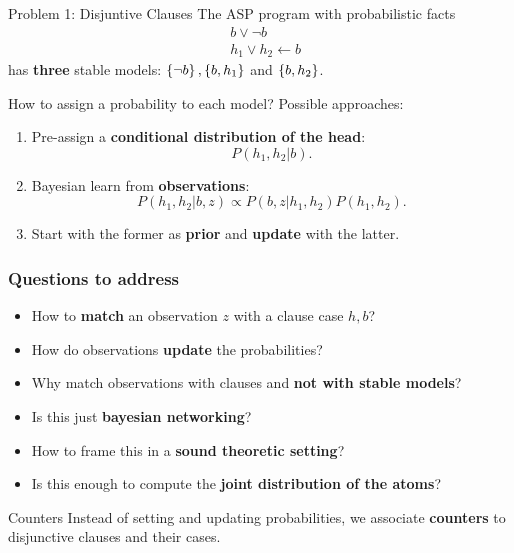 \documentclass[bigger]{beamer}
\begin{document}
    \begin{frame}{Problem 1: Disjuntive Clauses}
        The ASP program with probabilistic facts
        $$        
        \begin{aligned}
            &b \vee \neg b\\
            &h_1 \vee h_2 \leftarrow b
        \end{aligned}
        $$
        has \textbf{three} stable models: $\set{\neg b}, \set{b, h_1}$ and $\set{b, h_2}$.  

        \begin{block}{How to assign a probability to each model?}
            \pause 
            Possible approaches:
            \begin{enumerate}
                \item Pre-assign a \textbf{conditional distribution of the head}:
                $$P(h_1, h_2 | b).$$
                \item Bayesian learn from \textbf{observations}:
                $$P(h_1, h_2 | b,z) \propto P(b, z | h_1, h_2) P(h_1, h_2).$$
                \item Start with the former as \textbf{prior} and \textbf{update} with the latter.
            \end{enumerate}     
        \end{block}       
    
    \end{frame}

    \begin{frame}
        \frametitle{Questions to address}
    
        \begin{itemize}
            \item How to \textbf{match} an observation $z$ with a clause case $h,b$?
            \item How do observations \textbf{update} the probabilities?
            \item Why match observations with clauses and \textbf{not with stable models}?
            \item Is this just \textbf{bayesian networking}?
            \item How to frame this in a \textbf{sound theoretic setting}?
            \item Is this enough to compute the \textbf{joint distribution of the atoms}?
        \end{itemize}
        \begin{exampleblock}{Counters}
            Instead of setting and updating probabilities, we associate \textbf{counters} to disjunctive clauses and their cases.
        \end{exampleblock}
    
    \end{frame}
\end{document}
